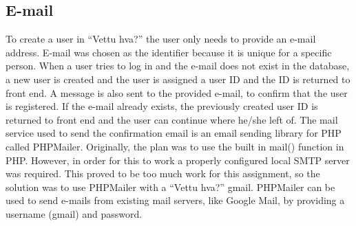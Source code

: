 \subsection{E-mail}

To create a user in “Vettu hva?” the user only needs to provide an e-mail address. E-mail was chosen as the identifier because it is unique for a specific person. When a user tries to log in and the e-mail does not exist in the database, a new user is created and the user is assigned a user ID and the ID is returned to front end. A message is also sent to the provided e-mail, to confirm that the user is registered. If the e-mail already exists, the previously created user ID is returned to front end and the user can continue where he/she left of. The mail service used to send the confirmation email is an email sending library for PHP called PHPMailer. Originally, the plan was to use the built in mail() function in PHP. However, in order for this to work a properly configured local SMTP server was required. This proved to be too much work for this assignment, so the solution was to use PHPMailer with a “Vettu hva?” gmail. PHPMailer can be used to send e-mails from existing mail servers, like Google Mail, by providing a username (gmail) and password.

\cleardoublepage